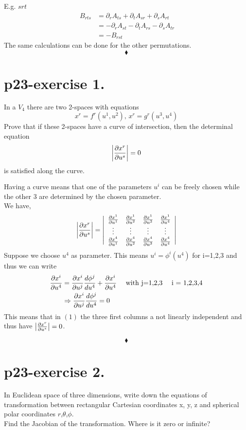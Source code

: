 E.g. $srt$
\begin{align*}
\ B_{rts} &= \partial_{r}{A_{ts}}+\partial_{t}{A_{sr}}+\partial_{s}{A_{rt}}\\
&= -\partial_{r}{A_{st}}-\partial_{t}{A_{rs}}-\partial_{s}{A_{tr}}\\
&= - B_{rst}
\end{align*}
The same calculations can be done for the other permutations.
$$\blacklozenge$$
\pagebreak[4]

\section{p23-exercise 1.}
\begin{tcolorbox}
In a $V_{4}$ there are two 2-spaces with equations
$$x^r = f^r(u^1,u^2)\text{, }x^r = g^r(u^3,u^4) $$
Prove that if these 2-spaces have a curve of intersection, then the determinal equation
$$\left|\pdv{x^r}{u^s}\right| = 0$$
is satisfied along the curve.
\end{tcolorbox}
Having a curve means that one of the parameters $u^i$ can be freely chosen while the other 3 are determined by the chosen parameter.\\
We have,
\begin{align}
\left|\pdv{x^r}{u^s}\right| = \left| {\begin{array}{cccc}
    \pdv{x^1}{u^1} & \pdv{x^1}{u^2} & \pdv{x^1}{u^3} & \pdv{x^1}{u^4}\\
    \vdots & \vdots & \vdots & \vdots\\
    \pdv{x^4}{u^1} & \pdv{x^4}{u^2} & \pdv{x^4}{u^3} & \pdv{x^4}{u^4}\\
  \end{array} } \right|
\end{align}
Suppose we choose $u^4$ as parameter.
This means $u^i = \phi^i(u^4)$ for i=1,2,3 and thus we can write
\begin{align*}
\pdv{x^i}{u^4} &= \pdv{x^i}{u^j}\dv{\phi^j}{u^4}+ \pdv{x^i}{u^4}\quad\text{ with j=1,2,3} \quad\text{  i = 1,2,3,4}\\
&\Rightarrow \pdv{x^i}{u^j}\dv{\phi^j}{u^4} = 0
\end{align*}
This means that in $(1)$ the three first columns a not linearly independent and thus have   $\left|\pdv{x^r}{u^s}\right| = 0$.

$$\blacklozenge$$
\newpage

\section{p23-exercise 2.}
\begin{tcolorbox}
In Euclidean space of three dimensions, write down the equations of transformation between rectangular Cartesian coordinates x, y, z and spherical polar coordinates $r$,$\theta$,$\phi$.\\
Find the Jacobian of the transformation. Where is it zero or infinite?
\end{tcolorbox}

